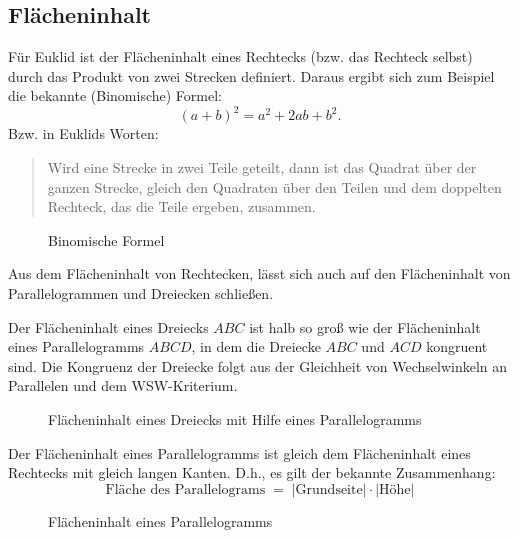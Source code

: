 \subsection*{Flächeninhalt}

Für Euklid ist der Flächeninhalt eines Rechtecks (bzw. das Rechteck selbst) durch das Produkt von
zwei Strecken definiert.  Daraus ergibt sich zum Beispiel die bekannte (Binomische) Formel:
$$
    (a+b)^2=a^2+2ab+b^2.
$$
Bzw. in Euklids Worten:
\begin{quote}
    Wird eine Strecke in zwei Teile geteilt, dann ist das Quadrat über der ganzen Strecke, gleich
    den Quadraten über den Teilen und dem doppelten Rechteck, das die Teile ergeben, zusammen.
\end{quote}

\begin{figure}[h]
    
    \caption{Binomische Formel}
\end{figure}

Aus dem Flächeninhalt von Rechtecken, lässt sich auch auf den Flächeninhalt von Parallelogrammen und
Dreiecken schließen.


Der Flächeninhalt eines Dreiecks $ABC$ ist halb so groß wie der Flächeninhalt eines Parallelogramms
$ABCD$, in dem die Dreiecke $ABC$ und $ACD$ kongruent sind. Die Kongruenz der Dreiecke folgt aus
der Gleichheit von Wechselwinkeln an Parallelen und dem WSW-Kriterium.

\begin{figure}[h]
    
    \caption{Flächeninhalt eines Dreiecks mit Hilfe eines Parallelogramms}
\end{figure}

Der Flächeninhalt eines Parallelogramms ist gleich dem Flächeninhalt eines Rechtecks mit gleich
langen Kanten. D.h., es gilt der bekannte Zusammenhang:
$$
    \mbox{Fläche des Parallelograms} \; = \; |\mbox{Grundseite}| \cdot |\mbox{Höhe}|
$$

\begin{figure}[h]
    
    \caption{Flächeninhalt eines Parallelogramms}
\end{figure}


